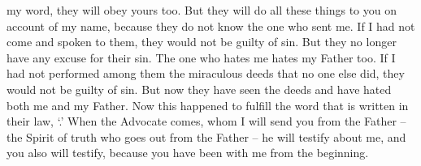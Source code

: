 {my
word,
they will obey
yours
too.
But
they will do
all
these things
to
you
on account of
my
name,
because
they do
not
know
the one who sent
me.
If
I had
not
come
and
spoken
to them,
they would
not
be guilty
of sin.
But
they
no longer
have
any excuse
for
their
sin.
The one who hates
me
hates
my
Father
too.
If
I had
not
performed
among
them
the miraculous deeds
that no one
else
did,
they would
not
be guilty
of sin.
But
now
they have seen
the deeds and
have hated
both
me
and
my
Father.
Now this happened to
fulfill
the word
that is written
in
their
law, ‘{}.’
When
the Advocate
comes,
whom
I
will send
you
from
the Father
– the Spirit
of truth
who
goes out
from
the Father
– he will testify
about
me,
and
you
also
will testify,
because
you have been
with
me
from
the beginning.

}
